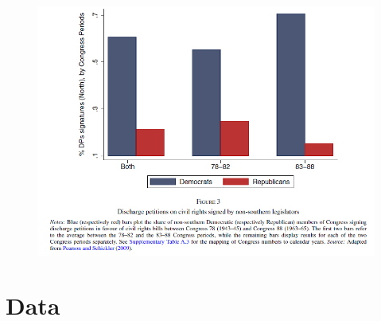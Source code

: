 \documentclass[dvipdfmx,11pt]{beamer}
\begin{document}
\begin{frame}{}
  \begin{figure}
    \centering
    \includegraphics[scale = .5]{fig_tab/os20220708/F3.png}
  \end{figure}
\end{frame}

\section{Data}
\frame{\sectionpage}
\end{document}
